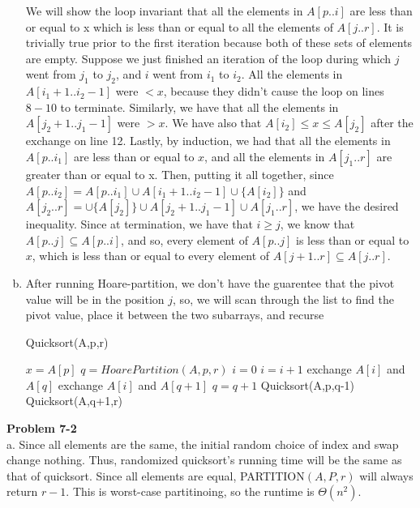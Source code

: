 \documentclass{article}
\begin{document}
\begin{enumerate}[a.]
We will show the loop invariant that all the elements in $A[p .. i]$ are less than or equal to x which is less than or equal to all the elements of $A[j..r]$. It is trivially true prior to the first iteration because both of these sets of elements are empty. Suppose we just finished an iteration of the loop during which $j$ went from $j_1$ to $j_2$, and $i$ went from $i_1$ to $i_2$. All the elements in $A[i_1 +1 .. i_2-1]$ were $<x$, because they didn't cause the loop on lines $8-10$ to terminate. Similarly, we have that all the elements in $A[j_2+1 .. j_1-1]$ were $>x$. We have also that $A[i_2] \le x \le A[j_2]$ after the exchange on line 12. Lastly, by induction, we had that all the elements in $A[p .. i_1]$ are less than or equal to $x$, and all the elements in $A[j_1 .. r]$ are greater than or equal to x. Then, putting it all together, since $A[p ..i_2] = A[p..i_1] \cup A[i_1+1 .. i_2-1] \cup \{A[i_2]\}$ and $A[j_2 .. r] = \cup \{A[j_2]\} \cup A[j_2+1..j_1-1] \cup A[j_1 .. r]$, we have the desired inequality. Since at termination, we have that $i\ge j$, we know that $A[p..j]\subseteq A[p..i]$, and so, every element of $A[p..j]$ is less than or equal to $x$, which is less than or equal to every element of $A[j+1..r]\subseteq A[j..r]$.

\item

After running Hoare-partition, we don't have the guarentee that the pivot value will be in the position $j$, so, we will scan through the list to find the pivot value, place it between the two subarrays, and recurse

\begin{algorithm}
Quicksort(A,p,r)
\begin{algorithmic}[1]
\State $x = A[p]$
\State $q = HoarePartition(A,p,r)$
\State $i=0$
\State $i=i+1$
\EndWhile
{}
\State exchange $A[i]$ and $A[q]$
\Else
\State exchange $A[i]$ and $A[q+1]$
\State $q = q+1$
\EndIf
\State Quicksort(A,p,q-1)
\State Quicksort(A,q+1,r)
\EndIf
\end{algorithmic}
\end{algorithm}

\end{enumerate}

\noindent\textbf{Problem 7-2}\\

a.  Since all elements are the same, the initial random choice of index and swap change nothing.  Thus, randomized quicksort's running time will be the same as that of quicksort.  Since all elements are equal, PARTITION$(A,P,r)$ will always return $r-1$.  This is worst-case partitinoing, so the runtime is $\Theta(n^2)$. \\
\end{document}
